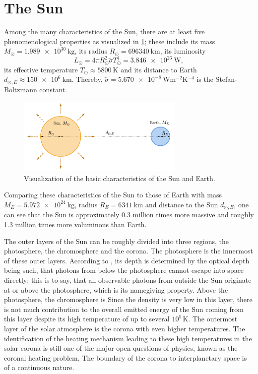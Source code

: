 \documentclass[a4paper,11pt]{report}
\def\lk#1{{\color{black}{#1}}}
\begin{document}
\section{The Sun}
Among the many characteristics of the Sun, there are at least five phenomenological properties as visualized in \cref{fig:SunEarth}; these include its mass $M_\odot = \SI{1.989e30}{\kilogram}$, its radius $R_\odot = \SI{696340}{\kilo\meter}$, its luminosity \begin{equation}L_\odot = 4\pi R_\odot^2 \tilde{\sigma} T_\odot^4 = \SI{3.846e26}{\watt},
\end{equation} its effective temperature $T_{\odot} \approx \SI{5800}{\kelvin}$ and its distance to Earth $d_{\odot,E} \approx \SI{150e6}{\kilo\meter}$. Thereby, $\tilde{\sigma} = \SI{5.670e-8}{\watt\meter^{-2}\kelvin^{-4}}$ is the Stefan-Boltzmann constant.
\begin{figure}[h]
\centering
\includegraphics[width=8cm]{figures/SunEarth.pdf}
\caption{Visualization of the basic characteristics of the Sun and Earth.}
\label{fig:SunEarth}
\end{figure}
Comparing these characteristics of the Sun to those of Earth with mass $M_E = \SI{5.972e24}{\kilogram}$, radius $R_E = \SI{6341}{\kilo\meter}$ and distance to the Sun $d_{\odot,E}$, one can see that the Sun is approximately 0.3 million times more massive and roughly 1.3 million times more voluminous than Earth.


The outer layers of the Sun can be roughly divided into three regions, the photosphere, the chromosphere and the corona. The photosphere is the innermost of these outer layers. According to \cite[p.135]{Weigert.2006}, its depth is determined by the optical depth being such, that photons from below the photosphere cannot escape into space directly; this is to say, that all observable photons from outside the Sun originate at or above the photosphere, which is its namegiving property. Above the photosphere, the chromosphere is \lk{located.} Since the density is very low in this layer, there is not much contribution to the overall emitted energy of the Sun coming from this layer despite its high temperature of up to several $10^5\,\si{\kelvin}$. The outermost layer of the solar atmosphere is the corona with even higher temperatures. The identification of the heating mechanism leading to these high temperatures in the solar corona is still one of the major open questions of \lk{solar} physics, known as the coronal heating problem. The boundary of the corona to interplanetary space is of a continuous nature.
\end{document}
